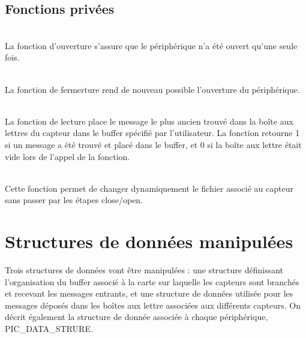 \subsection{Fonctions privées}

\begin{m_desc}
 \item [PIC\_Open] \hfill\\
La fonction d'ouverture s'assure que le périphérique n'a été ouvert qu'une seule fois. 

 \item [PIC\_Close] \hfill\\
La fonction de fermerture rend de nouveau possible l'ouverture du périphérique.

 \item [PIC\_Read] \hfill\\
La fonction de lecture place le message le plus ancien trouvé dans la boîte aux lettres du capteur dans le buffer spécifié par l'utilisateur. 
La fonction retourne 1 si un message a été trouvé et placé dans le buffer, et 0 si la boîte aux lettre était vide lors de l'appel de la fonction.

 \item [PIC\_IoCtl] \hfill\\
Cette fonction permet de changer dynamiquement le fichier associé au capteur sans passer par les étapes close/open.

\end{m_desc}

\section{Structures de données manipulées}

Trois structures de données vont être manipulées : une structure définissant l'organisation du buffer associé à la carte sur laquelle les capteurs sont branchés et recevant les messages entrants, et une structure de données utilisée pour les messages déposés dans les boîtes aux lettre associées aux différents capteurs. On décrit également la structure de donnée associée à chaque périphérique, PIC\_DATA\_STRURE.

